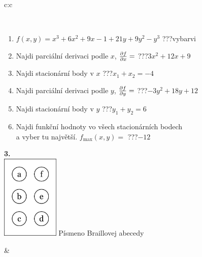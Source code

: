 \documentclass[10pt]{report}
\begin{document}
\begin{tabular}{c:c}
\begin{minipage}[c][104.5mm][t]{0.5\linewidth}
\begin{center}
\begin{minipage}{0.95\linewidth}
\begin{center}
\end{center}
\end{minipage}
\\[1mm]
\begin{minipage}{0.79\linewidth}
\begin{center}
\begin{varwidth}{\linewidth}
\begin{enumerate}
\normalsize
\item $f(x,y)=x^3+6x^2+9x-1+21y+9y^2-y^3$\quad \dotfill\; ???\;\dotfill \quad vybarvi
\item Najdi parciální derivaci podle $x$, $\pdv{f}{x}=$\quad \dotfill\; ???\;\dotfill \quad $3x^2+12x+9$
\item Najdi stacionární body v $x$\quad \dotfill\; ???\;\dotfill \quad $x_1+x_2=-4$
\item Najdi parciální derivaci podle $y$, $\pdv{f}{y}=$\quad \dotfill\; ???\;\dotfill \quad $-3y^2+18y+12$
\item Najdi stacionární body v $y$\quad \dotfill\; ???\;\dotfill \quad $y_1+y_2=6$
\item Najdi funkční hodnoty vo všech stacionárních bodech \\ \phantom{xxxxxx} a vyber tu najvětší. $f_{\text{max}}(x,y)=$\quad \dotfill\; ???\;\dotfill \quad $-12$
\end{enumerate}
\end{varwidth}
\end{center}
\end{minipage}
\begin{minipage}{0.20\linewidth}
\begin{center}
{\Huge\bfseries 3.} \\[2mm]
\includegraphics[height=40mm]{../images/braille.png}
{\small Písmeno Braillovej abecedy}
\end{center}
\end{minipage}
\end{center}
\end{minipage}
&
\begin{minipage}[c][104.5mm][t]{0.5\linewidth}
\begin{center}

\end{center}
\end{minipage}
\end{tabular}
\end{document}
